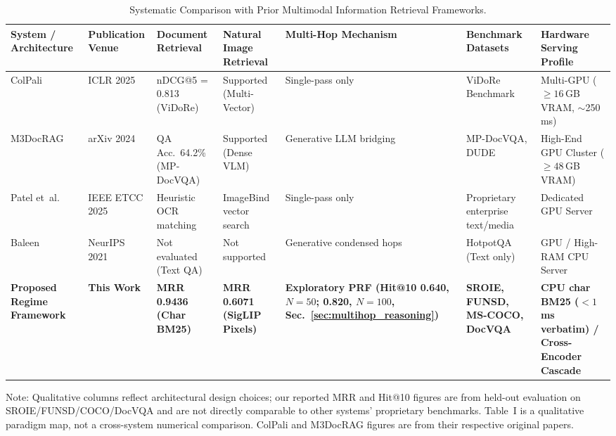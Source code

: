 \begin{table}[t]
\centering
\footnotesize
\setlength{\tabcolsep}{2.5pt}
\caption{Systematic Comparison with Prior Multimodal Information Retrieval Frameworks.}
\label{tab:sota_comparison}
\begin{tabular}{@{}p{2.2cm}p{1.6cm}p{2.2cm}p{2.0cm}p{2.3cm}p{2.0cm}p{3.6cm}@{}}
\toprule
\textbf{System / Architecture} & \textbf{Publication Venue} & \textbf{Document Retrieval} & \textbf{Natural Image Retrieval} & \textbf{Multi-Hop Mechanism} & \textbf{Benchmark Datasets} & \textbf{Hardware Serving Profile} \\ \midrule
ColPali \cite{faysse2024colpali} & ICLR 2025 & nDCG@5 = 0.813 (ViDoRe) & Supported (Multi-Vector) & Single-pass only & ViDoRe Benchmark & Multi-GPU ($\ge 16$\,GB VRAM, $\sim$250\,ms) \\
M3DocRAG \cite{cho2024m3docrag} & arXiv 2024 & QA Acc.\ 64.2\% (MP-DocVQA) & Supported (Dense VLM) & Generative LLM bridging & MP-DocVQA, DUDE & High-End GPU Cluster ($\ge 48$\,GB VRAM) \\
Patel et~al. \cite{patel2025multimodal} & IEEE ETCC 2025 & Heuristic OCR matching & ImageBind vector search & Single-pass only & Proprietary enterprise text/media & Dedicated GPU Server \\
Baleen \cite{khattab2021baleen} & NeurIPS 2021 & Not evaluated (Text QA) & Not supported & Generative condensed hops & HotpotQA (Text only) & GPU / High-RAM CPU Server \\
\textbf{Proposed Regime Framework} & \textbf{This Work} & \textbf{MRR 0.9436 (Char BM25)} & \textbf{MRR 0.6071 (SigLIP Pixels)} & \textbf{Exploratory PRF (Hit@10 0.640, $N=50$; 0.820, $N=100$, Sec.~\ref{sec:multihop_reasoning})} & \textbf{SROIE, FUNSD, MS-COCO, DocVQA} & \textbf{CPU char BM25 ($<1$\,ms verbatim) / Cross-Encoder Cascade} \\ \bottomrule
\end{tabular}
\vspace{0mm}\newline
\raggedright\scriptsize Note: Qualitative columns reflect architectural design choices; our reported MRR and Hit@10 figures are from held-out evaluation on SROIE/FUNSD/COCO/DocVQA and are not directly comparable to other systems' proprietary benchmarks. Table~I is a qualitative paradigm map, not a cross-system numerical comparison. ColPali and M3DocRAG figures are from their respective original papers.
\end{table}


